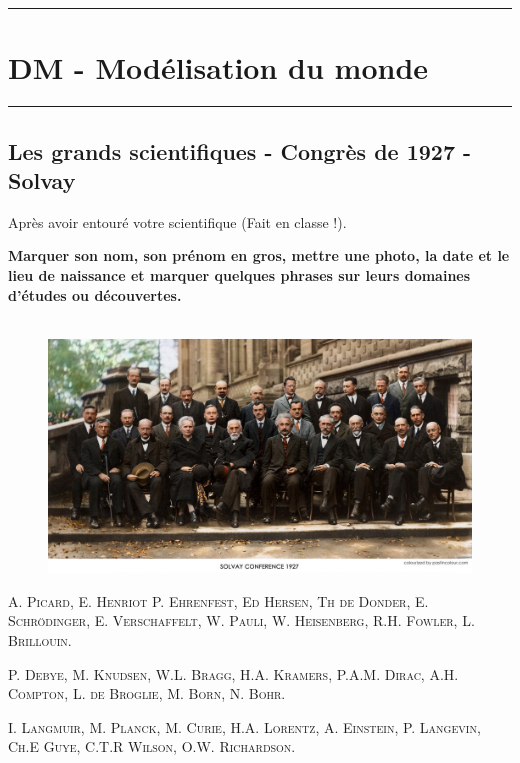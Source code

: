 \documentclass[11pt,landscape]{article}
\newcommand{\horrule}[1]{\rule{\linewidth}{#1}} %
\begin{document}
\setlength{\columnseprule}{1pt}

\horrule{2px}
\section*{DM - Modélisation du monde}
\horrule{2px}
\vspace{-1cm}

\subsection*{Les grands scientifiques - Congrès de 1927 - Solvay}

Après avoir entouré votre scientifique (Fait en classe !). 

\textbf{Marquer son nom, son prénom en gros, mettre une photo, la date et le lieu de naissance et marquer quelques phrases sur leurs domaines d'études ou découvertes.}

    \begin{figure}[H]
        \centering
        \includegraphics[width=0.8\linewidth]{4x5-calcul-litteral-1/sources/solvay.png}
  \end{figure}

\begin{center}
\textsc{A. Picard, E. Henriot P. Ehrenfest, Ed Hersen, Th de Donder, E. Schrödinger, E. Verschaffelt, W. Pauli, W. Heisenberg, R.H. Fowler, L. Brillouin.}

\textsc{P. Debye, M. Knudsen, W.L. Bragg, H.A. Kramers, P.A.M. Dirac, A.H. Compton, L. de Broglie, M. Born, N. Bohr.}

\textsc{I. Langmuir, M. Planck, M. Curie, H.A. Lorentz, A. Einstein, P. Langevin, Ch.E Guye, C.T.R Wilson, O.W. Richardson.}
\end{center}
\end{document}
